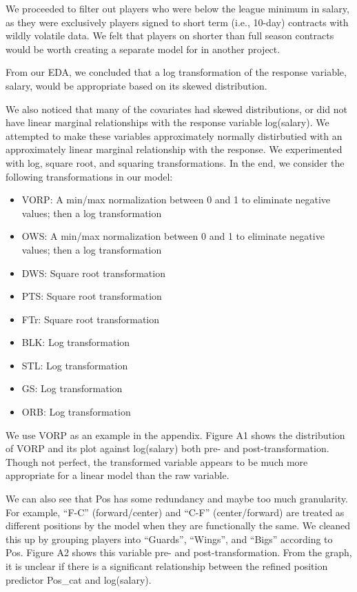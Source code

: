 \documentclass[]{article}
\providecommand{\tightlist}{%
  \setlength{\itemsep}{0pt}\setlength{\parskip}{0pt}}
\begin{document}
We proceeded to filter out players who were below the league minimum in
salary, as they were exclusively players signed to short term (i.e.,
10-day) contracts with wildly volatile data. We felt that players on
shorter than full season contracts would be worth creating a separate
model for in another project.

From our EDA, we concluded that a log transformation of the response
variable, salary, would be appropriate based on its skewed distribution.

We also noticed that many of the covariates had skewed distributions, or
did not have linear marginal relationships with the response variable
log(salary). We attempted to make these variables approximately normally
distirbutied with an approximately linear marginal relationship with the
response. We experimented with log, square root, and squaring
transformations. In the end, we consider the following transformations
in our model:

\begin{itemize}
\tightlist
\item
  VORP: A min/max normalization between 0 and 1 to eliminate negative
  values; then a log transformation
\item
  OWS: A min/max normalization between 0 and 1 to eliminate negative
  values; then a log transformation
\item
  DWS: Square root transformation
\item
  PTS: Square root transformation
\item
  FTr: Square root transformation
\item
  BLK: Log transformation
\item
  STL: Log transformation
\item
  GS: Log transformation
\item
  ORB: Log transformation
\end{itemize}

We use VORP as an example in the appendix. Figure A1 shows the
distribution of VORP and its plot against log(salary) both pre- and
post-transformation. Though not perfect, the transformed variable
appears to be much more appropriate for a linear model than the raw
variable.

We can also see that Pos has some redundancy and maybe too much
granularity. For example, ``F-C'' (forward/center) and ``C-F''
(center/forward) are treated as different positions by the model when
they are functionally the same. We cleaned this up by grouping players
into ``Guards'', ``Wings'', and ``Bigs'' according to Pos. Figure A2
shows this variable pre- and post-transformation. From the graph, it is
unclear if there is a significant relationship between the refined
position predictor Pos\_cat and log(salary).
\end{document}
